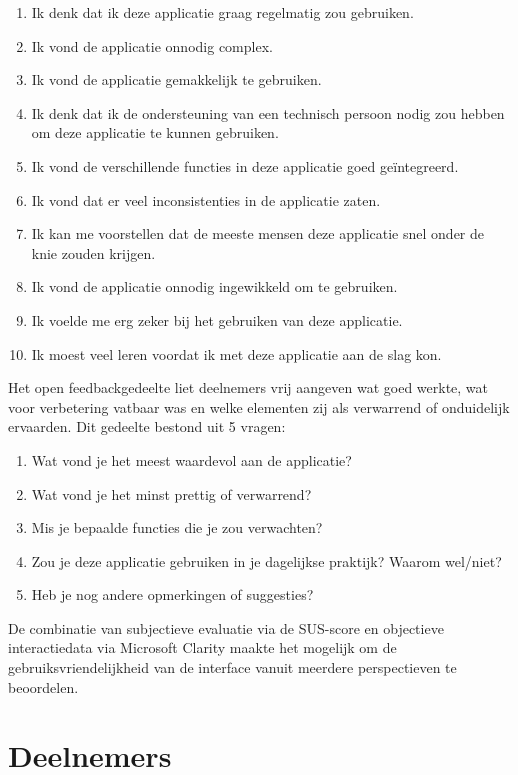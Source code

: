 \begin{enumerate}
    \item Ik denk dat ik deze applicatie graag regelmatig zou gebruiken.
    \item Ik vond de applicatie onnodig complex.
    \item Ik vond de applicatie gemakkelijk te gebruiken.
    \item Ik denk dat ik de ondersteuning van een technisch persoon nodig zou hebben om deze applicatie te kunnen gebruiken.
    \item Ik vond de verschillende functies in deze applicatie goed geïntegreerd.
    \item Ik vond dat er veel inconsistenties in de applicatie zaten.
    \item Ik kan me voorstellen dat de meeste mensen deze applicatie snel onder de knie zouden krijgen.
    \item Ik vond de applicatie onnodig ingewikkeld om te gebruiken.
    \item Ik voelde me erg zeker bij het gebruiken van deze applicatie.
    \item Ik moest veel leren voordat ik met deze applicatie aan de slag kon.
\end{enumerate}

Het open feedbackgedeelte liet deelnemers vrij aangeven wat goed werkte, wat voor verbetering vatbaar was en welke elementen zij als verwarrend of onduidelijk ervaarden.
Dit gedeelte bestond uit 5 vragen:

\begin{enumerate}
    \item Wat vond je het meest waardevol aan de applicatie?
    \item Wat vond je het minst prettig of verwarrend?
    \item Mis je bepaalde functies die je zou verwachten?
    \item Zou je deze applicatie gebruiken in je dagelijkse praktijk? Waarom wel/niet?
    \item Heb je nog andere opmerkingen of suggesties?
\end{enumerate}

De combinatie van subjectieve evaluatie via de SUS-score en objectieve interactiedata via Microsoft Clarity maakte het mogelijk om de gebruiksvriendelijkheid van de interface vanuit meerdere perspectieven te beoordelen.

\section{Deelnemers}
\label{sec:deelnemers}

